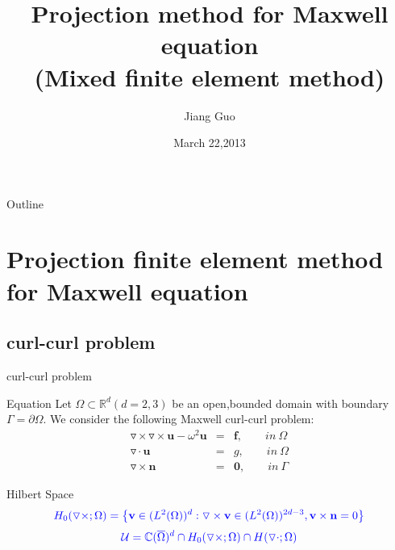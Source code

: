 \documentclass[13pt]{beamer}
\begin{document}

\title{Projection method for Maxwell equation\\(Mixed finite element method)}
\author{\color{blue}Jiang Guo}
\date{March 22,2013}

\begin{frame}
  \titlepage
\end{frame}

\begin{frame}{Outline}
  \tableofcontents
\end{frame}

\section{Projection finite element method for Maxwell equation}

\subsection{curl-curl problem}

\begin{frame}[t]{curl-curl problem}
  \begin{block}{Equation}
   Let $\Omega\subset\mathbb{R}^d (d=2,3)$ be an open,bounded domain with boundary $\Gamma=\partial\Omega.$
We consider the following Maxwell curl-curl problem:
  \begin{eqnarray}
     \triangledown\times\triangledown\times \textbf{u} - \omega^2\mathbf{u} & = & \mathbf{f}, \qquad  in\ \Omega \\
     \triangledown\cdot\mathbf{u}  & = & g, \qquad in \ \Omega \\
     \triangledown\times\mathbf{n} & = & \mathbf{0}, \qquad in\ \Gamma
  \end{eqnarray}
  \end{block}
  \begin{block}{Hilbert Space}
    \begin{equation}\label{space:U_h}
        \nonumber
        {\color{blue}H_0(\triangledown\times;\Omega) = \big\{\mathbf{v}\in (L^2(\Omega))^d : \triangledown\times\mathbf{v}\in (L^2(\Omega))^{2d-3}, \mathbf{v}\times\mathbf{n} = 0\big\}}
        \end{equation}
        \begin{equation}\label{space:U+_h}
        \nonumber
        {\color{blue}\mathcal{U} = \mathbb{C}(\overline{\Omega})^d\cap H_0(\triangledown\times;\Omega)\cap H(\triangledown\cdot;\Omega)}
    \end{equation}
  \end{block}
\end{frame}
\end{document}
